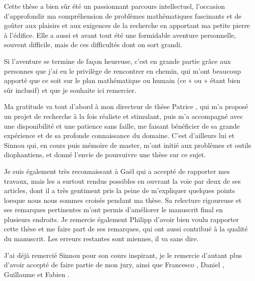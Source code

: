
\let\chapter\chapter %

Cette thèse a bien sûr été un passionnant parcours intellectuel, l'occasion
d'approfondir ma compréhension de problèmes mathématiques fascinants et de
goûter aux plaisirs et aux exigences de la recherche en apportant ma petite
pierre à l'édifice. Elle a aussi et avant tout été une formidable
aventure personnelle, souvent difficile, mais de ces difficultés dont on sort
grandi.

Si l'aventure se termine de façon heureuse, c'est en grande partie grâce aux
personnes que j'ai eu le privilège de rencontrer en chemin, qui m'ont beaucoup
apporté que ce soit sur le plan mathématique ou humain (ce « ou » étant bien
sûr inclusif) et que je souhaite ici remercier.

\medskip

Ma gratitude va tout d'abord à mon directeur de thèse Patrice ,
qui m'a proposé un projet de recherche à la fois réaliste et stimulant, puis
m'a accompagné avec une disponibilité et une patience sans faille, me faisant
bénéficier de sa grande expérience et de sa profonde connaissance du domaine.
C'est d'ailleurs lui et Sinnou  qui, en cours puis mémoire de
master, m'ont initié aux problèmes et outils diophantiens, et donné l'envie de
poursuivre une thèse sur ce sujet.

Je suis également très reconnaissant à Gaël  qui a accepté de
rapporter mes travaux, mais les a surtout rendus possibles en ouvrant la voie
par deux de ses articles, dont il a très gentiment pris la peine de
m'expliquer quelques points lorsque nous nous sommes croisés pendant ma
thèse. Sa relecture rigoureuse et ses remarques pertinentes m'ont permis
d'améliorer le manuscrit final en plusieurs endroits.
Je remercie également Philipp  d'avoir bien voulu
rapporter cette thèse et me faire part de ses remarques, qui ont aussi
contribué à la qualité du manuscrit. Les erreurs restantes sont miennes, il
va sans dire.

J'ai déjà remercié Sinnou  pour son cours inspirant, je le remercie
d'autant plus d'avoir accepté de faire partie de mon jury, ainsi que Francesco
, Daniel , Guillaume  et Fabien
.

